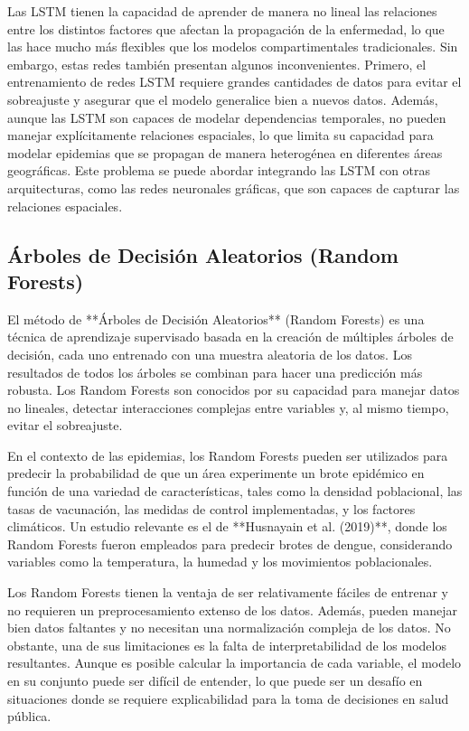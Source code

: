 Las LSTM tienen la capacidad de aprender de manera no lineal las relaciones entre los distintos factores que afectan la propagación de la enfermedad, lo que las hace mucho más flexibles que los modelos compartimentales tradicionales. Sin embargo, estas redes también presentan algunos inconvenientes. Primero, el entrenamiento de redes LSTM requiere grandes cantidades de datos para evitar el sobreajuste y asegurar que el modelo generalice bien a nuevos datos. Además, aunque las LSTM son capaces de modelar dependencias temporales, no pueden manejar explícitamente relaciones espaciales, lo que limita su capacidad para modelar epidemias que se propagan de manera heterogénea en diferentes áreas geográficas. Este problema se puede abordar integrando las LSTM con otras arquitecturas, como las redes neuronales gráficas, que son capaces de capturar las relaciones espaciales.

\subsection{Árboles de Decisión Aleatorios (Random Forests)}

El método de **Árboles de Decisión Aleatorios** (Random Forests) es una técnica de aprendizaje supervisado basada en la creación de múltiples árboles de decisión, cada uno entrenado con una muestra aleatoria de los datos. Los resultados de todos los árboles se combinan para hacer una predicción más robusta. Los Random Forests son conocidos por su capacidad para manejar datos no lineales, detectar interacciones complejas entre variables y, al mismo tiempo, evitar el sobreajuste.

En el contexto de las epidemias, los Random Forests pueden ser utilizados para predecir la probabilidad de que un área experimente un brote epidémico en función de una variedad de características, tales como la densidad poblacional, las tasas de vacunación, las medidas de control implementadas, y los factores climáticos. Un estudio relevante es el de **Husnayain et al. (2019)**, donde los Random Forests fueron empleados para predecir brotes de dengue, considerando variables como la temperatura, la humedad y los movimientos poblacionales.

Los Random Forests tienen la ventaja de ser relativamente fáciles de entrenar y no requieren un preprocesamiento extenso de los datos. Además, pueden manejar bien datos faltantes y no necesitan una normalización compleja de los datos. No obstante, una de sus limitaciones es la falta de interpretabilidad de los modelos resultantes. Aunque es posible calcular la importancia de cada variable, el modelo en su conjunto puede ser difícil de entender, lo que puede ser un desafío en situaciones donde se requiere explicabilidad para la toma de decisiones en salud pública.

